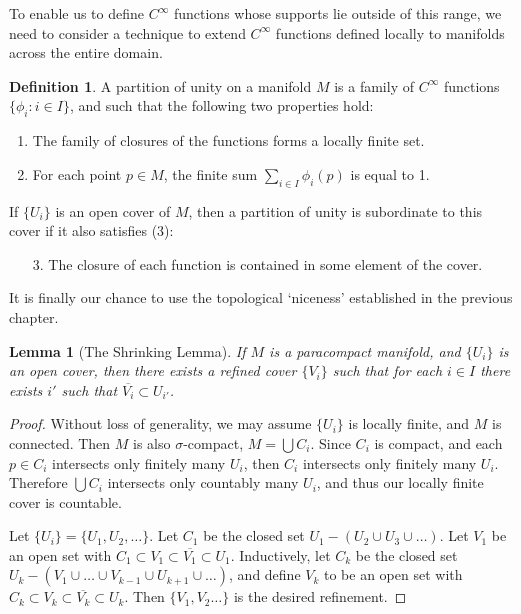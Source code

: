 \documentclass[12pt]{report}
\theoremstyle{plain}
\newtheorem{lemma}[theorem]{Lemma}
\theoremstyle{definition}
\newtheorem*{defi}{Definition}
\newenvironment{definition}
    {\begin{samepage}\begin{framed}\begin{defi}}
    {\end{defi}\end{framed}\end{samepage}}
\begin{document}
To enable us to define $C^\infty$ functions whose supports lie outside of this range, we need to consider a technique to extend $C^\infty$ functions defined locally to manifolds across the entire domain.

\begin{definition}
    A partition of unity on a manifold $M$ is a family of $C^\infty$ functions $\{ \phi_i : i \in I \}$, and such that the following two properties hold:
    \begin{enumerate}
        \item The family of closures of the functions forms a locally finite set.
        \item For each point $p \in M$, the finite sum $\sum_{i \in I} \phi_i(p)$ is equal to 1.
    \end{enumerate}
    If $\{ U_i \}$ is an open cover of $M$, then a partition of unity is subordinate to this cover if it also satisfies (3):
    \begin{enumerate}
        \item[3.] The closure of each function is contained in some element of the cover.
    \end{enumerate}
\end{definition}

It is finally our chance to use the topological `niceness' established in the previous chapter.

\begin{lemma}[The Shrinking Lemma]
    If $M$ is a paracompact manifold, and $\{ U_i \}$ is an open cover, then there exists a refined cover $\{ V_i \}$ such that for each $i \in I$ there exists $i'$ such that $\overline{V_i} \subset U_{i'}$.
\end{lemma}
\begin{proof}
    Without loss of generality, we may assume $\{ U_i \}$ is locally finite, and $M$ is connected. Then $M$ is also $\sigma$-compact, $M = \bigcup C_i$. Since $C_i$ is compact, and each $p \in C_i$ intersects only finitely many $U_i$, then $C_i$ intersects only finitely many $U_i$. Therefore $\bigcup C_i$ intersects only countably many $U_i$, and thus our locally finite cover is countable.

    Let $\{ U_i \} = \{ U_1, U_2, \dots \}$. Let $C_1$ be the closed set $U_1 - (U_2 \cup U_3 \cup \dots)$. Let $V_1$ be an open set with $C_1 \subset V_1 \subset \overline{V_1} \subset U_1$. Inductively, let $C_k$ be the closed set $U_k - (V_1 \cup \dots \cup V_{k-1} \cup U_{k+1} \cup \dots)$, and define $V_k$ to be an open set with $C_k \subset V_k \subset \overline{V_k} \subset U_k$. Then $\{ V_1, V_2 \dots \}$ is the desired refinement.
\end{proof}
\end{document}
